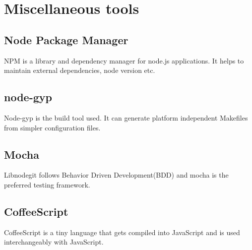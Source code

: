 \section{Miscellaneous tools}

\subsection{Node Package Manager}
NPM is a library and dependency manager for node.js applications. It helps to
maintain external dependencies, node version etc.

\subsection{node-gyp}
Node-gyp is the build tool used. It can generate platform independent Makefiles
from simpler configuration files.

\subsection{Mocha}
Libnodegit follows Behavior Driven Development(BDD) and mocha is the preferred
testing framework.

\subsection{CoffeeScript}
CoffeeScript is a tiny language that gets compiled into JavaScript and is used
interchangeably with JavaScript.
